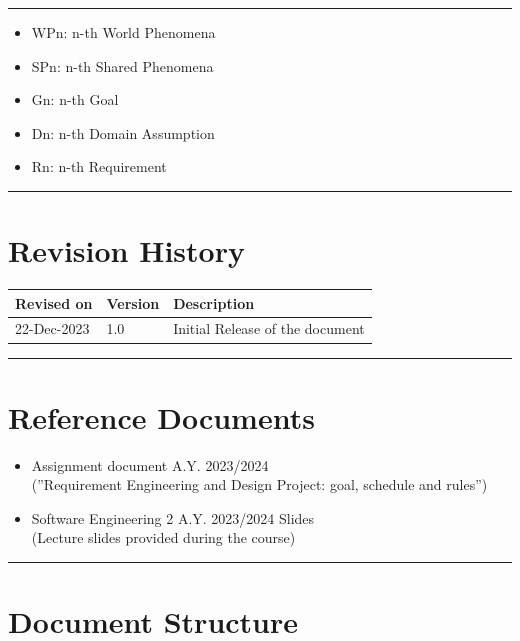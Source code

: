 \documentclass{Configuration_Files/Template}
\begin{document}
{\color{bluepoli}\rule{\linewidth}{0.1pt}}

\begin{itemize}
\item \textcolor{bluepoli}{WPn:} n-th World Phenomena
\item \textcolor{bluepoli}{SPn:} n-th Shared Phenomena
\item \textcolor{bluepoli}{Gn:} n-th Goal
\item \textcolor{bluepoli}{Dn:} n-th Domain Assumption
\item \textcolor{bluepoli}{Rn:} n-th Requirement
\end{itemize}

{\color{bluepoli}\rule{\linewidth}{0.1pt}}

\section{Revision History}

\noindent
\begin{tabularx}{\textwidth}{llX}
    \toprule
    Revised on & Version & Description \\
    \midrule
    22-Dec-2023 & 1.0 & Initial Release of the document \\
    \bottomrule
\end{tabularx}
\vspace{0.33pt}

{\color{bluepoli}\rule{\linewidth}{0.1pt}}

\section{Reference Documents}

\begin{itemize}
\item \textcolor{bluepoli}{Assignment document A.Y. 2023/2024}\\
(”Requirement Engineering and Design Project: goal, schedule and rules”)
\item \textcolor{bluepoli}{Software Engineering 2 A.Y. 2023/2024 Slides}\\
(Lecture slides provided during the course)
\end{itemize}

{\color{bluepoli}\rule{\linewidth}{0.1pt}}

\section{Document Structure}
\end{document}
